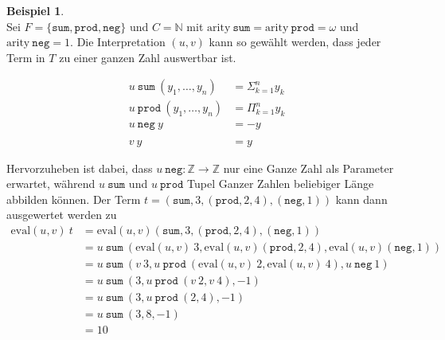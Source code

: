 \documentclass{scrartcl}
\numberwithin{figure}{section} %
\theoremstyle{definition} %
\newcommand{\elems}[3]{{#1}_{#2}, \dots, {#1}_{#3}}
\begin{document}
\newtheorem{bEval}[bsp]{Beispiel}
\begin{bEval}~\\
Sei $F = \{\texttt{sum}, \texttt{prod}, \texttt{neg} \}$ und $C = \mathbb{N}$ mit $\mathrm{arity}~ \texttt{sum} = \mathrm{arity}~ \texttt{prod} = \omega$ und $\mathrm{arity}~ \texttt{neg} = 1$.
Die Interpretation $(u, v)$ kann so gewählt werden, dass jeder Term in $T$ zu einer ganzen Zahl auswertbar ist.

\begin{equation*}
    \begin{split}
    u~\texttt{sum}  ~(\elems y 1 n) &= \Sigma_{k = 1}^n y_k\\
    u~\texttt{prod} ~(\elems y 1 n) &=    \Pi_{k = 1}^n y_k\\
    u~\texttt{neg}~y &= -y\\
    &\\
    v~y &= y
    \end{split}
\end{equation*}

Hervorzuheben ist dabei, dass $u~\texttt{neg} \colon \mathbb Z \rightarrow \mathbb Z$ nur eine Ganze Zahl als Parameter erwartet, während $u~\texttt{sum}$ und $u~\texttt{prod}$ Tupel Ganzer Zahlen beliebiger Länge abbilden können.
Der Term $t = (\texttt{sum}, 3, (\texttt{prod}, 2, 4), (\texttt{neg}, 1))$ kann dann ausgewertet werden zu 
\begin{equation*}
    \begin{split}
    \mathrm{eval}(u, v)~t &= \mathrm{eval}(u, v) (\texttt{sum}, 3, (\texttt{prod}, 2, 4), (\texttt{neg}, 1)) \\
    &= u~\texttt{sum}~(\mathrm{eval}(u, v)~3, \mathrm{eval}(u, v)(\texttt{prod}, 2, 4),  \mathrm{eval}(u, v) (\texttt{neg}, 1)) \\
    &= u~\texttt{sum}~(v~3, u~\texttt{prod}~(\mathrm{eval}(u, v)~2, \mathrm{eval}(u, v)~4), u~\texttt{neg}~ 1) \\
    &= u~\texttt{sum}~(3, u~\texttt{prod}~(v~2, v~4), -1) \\
    &= u~\texttt{sum}~(3, u~\texttt{prod}~(2, 4), -1) \\
    &= u~\texttt{sum}~( 3, 8, -1) \\
    &= 10 \\
    \end{split}
\end{equation*}
\end{bEval}
\end{document}
